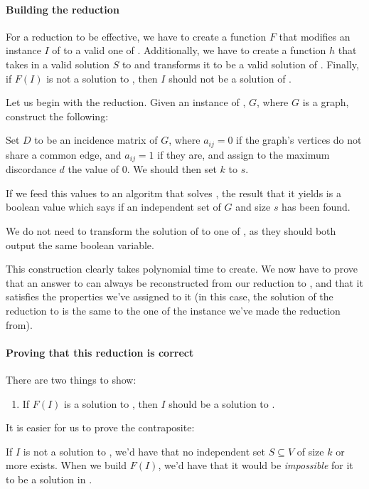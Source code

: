 \paragraph{Building the reduction}
For a reduction to be effective, we have to create a function $F$ that modifies an instance $I$ of \is{} to a valid one of \exc{}. Additionally, we have to create a function $h$ that takes in a valid solution $S$ to \exc{} and transforms it to be a valid solution of \is{}. Finally, if $F(I)$ is not a solution to \exc{}, then $I$ should not be a solution of \is{}.

Let us begin with the reduction. Given an instance of \is{}, $G$, where $G$ is a graph, construct the following:

Set $D$ to be an incidence matrix of $G$, where $a_{ij}=0$ if the graph's vertices do not share a common edge, and $a_{ij}=1$ if they are, and assign to the maximum discordance $d$ the value of 0. We should then set $k$ to $s$.

If we feed this values to an algoritm that solves \exc{}, the result that it yields is a boolean value which says if an independent set of $G$ and size $s$ has been found.

We do not need to transform the solution of \exc{} to one of \is{}, as they should both output the same boolean variable.

This construction clearly takes polynomial time to create. We now have to prove that an answer to \is{} can always be reconstructed from our reduction to \exc{}, and that it satisfies the properties we've assigned to it (in this case, the solution of the reduction to \exc{} is the same to the one of the \is{} instance we've made the reduction from).

\paragraph{Proving that this reduction is correct}

There are two things to show:

\begin{enumerate}
  \item If $F(I)$ is a solution to \exc{}, then $I$ should be a solution to \is{}.
\end{enumerate}

It is easier for us to prove the contraposite:

If $I$ is not a solution to \is{}, we'd have that no independent set $S \subseteq V$ of size $k$ or more exists. When we build $F(I)$, we'd have that it would be \textit{impossible} for it to be a solution in \exc{}.

